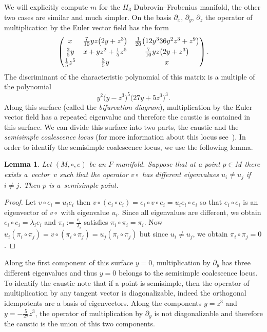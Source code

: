 \documentclass[pdftex]{sigma}
\numberwithin{equation}{section}
\newtheorem{Lemma}[Theorem]{Lemma}
\begin{document}
We will explicitly compute $m$ for the $H_{3}$ Dubrovin--Frobenius manifold, the other two cases are similar and much simpler. On the basis $\partial_{x}$, $\partial_{y}$, $\partial_{z}$ the operator of multiplication by the Euler vector field has the form
\begin{equation*}
 \begin{pmatrix}
 x & \frac{7}{10}yz\bigl(2y +z^{3}\bigr) & \frac{1}{20}\bigl(12y^{3}36y^{2}z^{3}+z^{9}\bigr)\vspace{1mm}\\
 \frac{3}{5}y&x+yz^{2}+\frac{1}{5}z^{5}&\frac{7}{10}yz\bigl(2y+z^{3}\bigr)\vspace{1mm} \\
 \frac{1}{5}z^{5}&\frac{3}{5}y&x
 \end{pmatrix}.
\end{equation*}
The discriminant of the characteristic polynomial of this matrix is a multiple of the polynomial
\begin{equation*}
 y^{2}\bigl(y-z^{3}\bigr)^{5}\bigl(27y+5z^{3}\bigr)^{3}.
\end{equation*}
Along this surface (called the \emph{bifurcation diagram}), multiplication by the Euler vector field has a repeated eigenvalue and therefore the caustic is contained in this surface. We can divide this surface into two parts, the caustic and the \emph{semisimple coalescence locus} (for more information about this locus see~\cite{MR4094756}). In order to identify the semisimple coalescence locus, we use the following lemma.
\begin{Lemma}
 Let $(M,\circ,e)$ be an $F$-manifold. Suppose that at a point $p\in M$ there exists a~vector~$v$ such that the operator $v\circ$ has different eigenvalues $u_{i}\neq u_{j}$ if $i\neq j$. Then $p$ is a~semisimple point.
\end{Lemma}
\begin{proof}
 Let $v\circ e_{i}=u_{i}e_{i}$ then $v\circ(e_{i}\circ e_{i})=e_{i}\circ v\circ e_{i}=u_{i}e_{i}\circ e_{i}$ so that $e_{i}\circ e_{i}$ is an eigenvector of $v\circ$ with eigenvalue $u_{i}$. Since all eigenvalues are different, we obtain $e_{i}\circ e_{i}=\lambda_{i}e_{i}$ and $\pi_{i}:=\tfrac{e_{i}}{\lambda_{i}}$ satisfies $\pi_{i}\circ\pi_{i}=\pi_{i}$. Now $u_{i}(\pi_{i}\circ\pi_{j})=v\circ(\pi_{i}\circ\pi_{j})=u_{j}(\pi_{i}\circ\pi_{j})$ but since $u_{i}\neq u_{j}$, we obtain $\pi_{i}\circ\pi_{j}=0$.
\end{proof}

Along the first component of this surface $y=0$, multiplication by $\partial_{y}$ has three different eigenvalues and thus $y=0$ belongs to the semisimple coalescence locus. To identify the caustic note that if a point is semisimple, then the operator of multiplication by any tangent vector is diagonalizable, indeed the orthogonal idempotents are a basis of eigenvectors. Along the components $y=z^{3}$ and $y=-\tfrac{5}{27}z^{3}$, the operator of multiplication by $\partial_{y}$ is not diagonalizable and therefore the caustic is the union of this two components.
\end{document}
